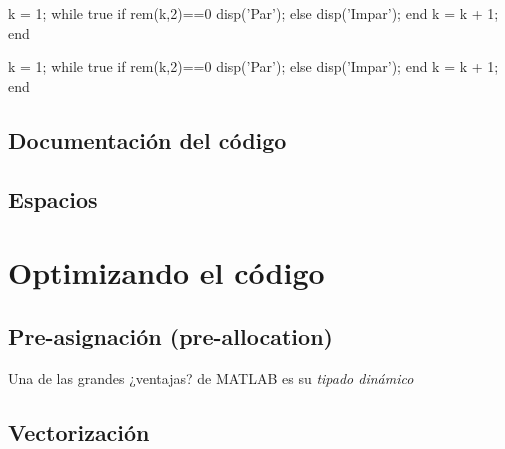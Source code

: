\begin{matlab}
k = 1;
while true
if rem(k,2)==0
disp('Par');
else
disp('Impar');
end
k = k + 1;
end
\end{matlab}

\begin{matlab}
k = 1;
while true
    if rem(k,2)==0
        disp('Par');
    else
        disp('Impar');
    end
    k = k + 1;
end
\end{matlab}

\subsection{Documentación del código}

\subsection{Espacios}

\section{Optimizando el código}

\subsection{Pre-asignación (pre-allocation)}

Una de las grandes ¿ventajas? de MATLAB es su \emph{tipado dinámico}

\subsection{Vectorización}
